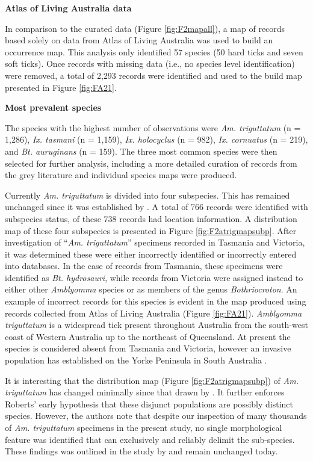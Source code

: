 \documentclass[a4paper, nobind]{templates/ociamthesis}
\begin{document}
\textbf{Atlas of Living Australia data}

In comparison to the curated data (Figure \ref{fig:F2mapall}), a map of records based solely on data from Atlas of Living Australia was used to build an occurrence map.
This analysis only identified 57 species (50 hard ticks and seven soft ticks).
Once records with missing data (i.e., no species level identification) were removed, a total of 2,293 records were identified and used to the build map presented in Figure \ref{fig:FA21}.

\textbf{Most prevalent species}

The species with the highest number of observations were \emph{Am. triguttatum} (n = 1,286), \emph{Ix. tasmani} (n = 1,159), \emph{Ix. holocyclus} (n = 982), \emph{Ix. cornuatus} (n = 219), and \emph{Bt. auruginans} (n = 159).
The three most common species were then selected for further analysis, including a more detailed curation of records from the grey literature and individual species maps were produced.

Currently \emph{Am. triguttatum} is divided into four subspecies.
This has remained unchanged since it was established by \textcite{robertsStatusMorphologicallyDivergent1962}.
A total of 766 records were identified with subspecies status, of these 738 records had location information.
A distribution map of these four subspecies is presented in Figure \ref{fig:F2atrigmapsubp}.
After investigation of ``\emph{Am. triguttatum}'' specimens recorded in Tasmania and Victoria,
it was determined these were either incorrectly identified or incorrectly entered into databases.
In the case of records from Tasmania, these specimens were identified as \emph{Bt. hydrosauri}, while records from Victoria were assigned instead to either other \emph{Amblyomma} species or as members of the genus \emph{Bothriocroton}.
An example of incorrect records for this species is evident in the map produced using records collected from Atlas of Living Australia (Figure \ref{fig:FA21}).
\emph{Amblyomma triguttatum} is a widespread tick present throughout Australia from the south-west coast of Western Australia up to the northeast of Queensland.
At present the species is considered absent from Tasmania and Victoria, however an invasive population has established on the Yorke Peninsula in South Australia \autocite{mcdiarmidRangeExpansionTick2000}.

It is interesting that the distribution map (Figure \ref{fig:F2atrigmapsubp}) of \emph{Am. triguttatum} has changed minimally since that drawn by \textcite{robertsStatusMorphologicallyDivergent1962}.
It further enforces Roberts' early hypothesis that these disjunct populations are possibly distinct species.
However, the authors note that despite our inspection of many thousands of \emph{Am. triguttatum} specimens in the present study, no single morphological feature was identified that can exclusively and reliably delimit the sub-species.
These findings was outlined in the study by \textcite{robertsStatusMorphologicallyDivergent1962} and remain unchanged today.
\end{document}

